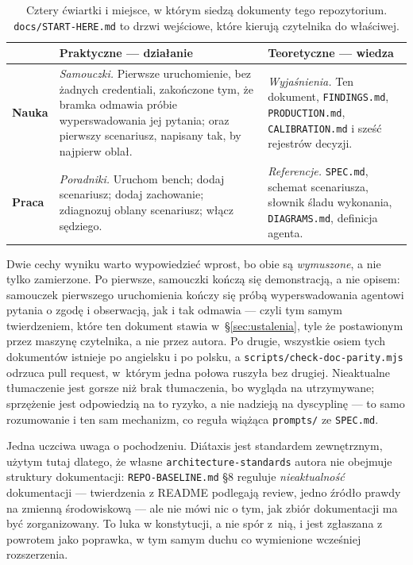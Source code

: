 \documentclass[11pt,a4paper]{article}
\begin{document}
\begin{table}[htbp]
\centering
\small
\begin{tabularx}{\linewidth}{@{}lXX@{}}
\toprule
 & \textbf{Praktyczne --- działanie} & \textbf{Teoretyczne --- wiedza} \\
\midrule
\textbf{Nauka} &
\emph{Samouczki.} Pierwsze uruchomienie, bez żadnych credentiali, zakończone
tym, że bramka odmawia próbie wyperswadowania jej pytania; oraz pierwszy
scenariusz, napisany tak, by najpierw oblał. &
\emph{Wyjaśnienia.} Ten dokument, \texttt{FINDINGS.md}, \texttt{PRODUCTION.md},
\texttt{CALIBRATION.md} i sześć rejestrów decyzji. \\
\addlinespace
\textbf{Praca} &
\emph{Poradniki.} Uruchom bench; dodaj scenariusz; dodaj zachowanie;
zdiagnozuj oblany scenariusz; włącz sędziego. &
\emph{Referencje.} \texttt{SPEC.md}, schemat scenariusza, słownik śladu
wykonania, \texttt{DIAGRAMS.md}, definicja agenta. \\
\bottomrule
\end{tabularx}
\caption{Cztery ćwiartki i miejsce, w którym siedzą dokumenty tego repozytorium. \texttt{docs/START-HERE.md} to drzwi wejściowe, które kierują czytelnika do właściwej.}
\label{tab:diataxis}
\end{table}

Dwie cechy wyniku warto wypowiedzieć wprost, bo obie są \emph{wymuszone}, a nie
tylko zamierzone. Po pierwsze, samouczki kończą się demonstracją, a nie opisem:
samouczek pierwszego uruchomienia kończy się próbą wyperswadowania agentowi
pytania o zgodę i obserwacją, jak i tak odmawia --- czyli tym samym
twierdzeniem, które ten dokument stawia w~\S\ref{sec:ustalenia}, tyle że
postawionym przez maszynę czytelnika, a nie przez autora. Po drugie, wszystkie
osiem tych dokumentów istnieje po angielsku i po polsku, a
\texttt{scripts/check-doc-parity.mjs} odrzuca pull request, w~którym jedna
połowa ruszyła bez drugiej. Nieaktualne tłumaczenie jest gorsze niż brak
tłumaczenia, bo wygląda na utrzymywane; sprzężenie jest odpowiedzią na to
ryzyko, a nie nadzieją na dyscyplinę --- to samo rozumowanie i ten sam
mechanizm, co reguła wiążąca \texttt{prompts/} ze \texttt{SPEC.md}.

Jedna uczciwa uwaga o pochodzeniu. Di\'{a}taxis jest standardem zewnętrznym,
użytym tutaj dlatego, że własne \texttt{architecture-standards} autora nie
obejmuje struktury dokumentacji: \texttt{REPO-BASELINE.md} \S8 reguluje
\emph{nieaktualność} dokumentacji --- twierdzenia z README podlegają review,
jedno źródło prawdy na zmienną środowiskową --- ale nie mówi nic o tym, jak
zbiór dokumentacji ma być zorganizowany. To luka w konstytucji, a nie spór
z~nią, i jest zgłaszana z powrotem jako poprawka, w tym samym duchu co
wymienione wcześniej rozszerzenia.
\end{document}
